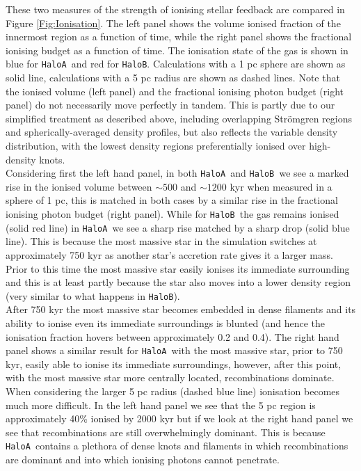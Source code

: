 \documentclass[graphics, twocolumn, usenatbib]{mn2e}
\newcommand{\ha} {\texttt{HaloA~}}
\newcommand{\hb} {\texttt{HaloB~}}
\newcommand{\hbc} {\texttt{HaloB}}
\begin{document}
These two measures of the strength of ionising stellar feedback are compared in
Figure \ref{Fig:Ionisation}. The left panel shows the volume ionised fraction of the innermost
region as a function of time, while the right panel shows
the fractional ionising budget as a function of time. The ionisation state of the gas is shown in
blue for \ha and red for \hbc. Calculations with a 1 pc sphere are shown as solid line, calculations
with a 5 pc radius are shown as dashed lines. Note that the ionised volume (left panel)
and the fractional ionising photon budget (right panel) do not necessarily
move perfectly in tandem. This is partly due to our simplified treatment as described above,
including overlapping Str{\" o}mgren regions and spherically-averaged density profiles, but also
reflects the variable density distribution, with the lowest density regions preferentially
ionised over high-density knots. \\
\indent Considering first the left hand panel, in both \ha and \hb we see a marked rise in the
ionised volume between $\sim 500$ and $\sim1200$ kyr when measured in a sphere of 1 pc, this is
matched in both cases by a similar rise in the fractional ionising photon budget (right panel).
While for \hb the gas remains ionised (solid red line) in \ha we see a sharp rise matched by a
sharp drop (solid blue line). This is because the most massive star in the simulation switches at
approximately 750 kyr as another star's accretion rate gives it a larger mass. Prior to this time
the most massive star easily ionises its immediate
surrounding and this is at least partly because the star also moves into a lower density region
(very similar to what happens in \hbc). \\
\indent After 750 kyr the most massive star becomes embedded in
dense filaments and its ability to ionise even its immediate surroundings is blunted (and hence the
ionisation fraction hovers between approximately 0.2 and 0.4). The
right hand panel shows a similar result for \ha with the most massive star, prior to 750 kyr, easily
able to ionise
its immediate surroundings, however, after this point, with the most massive star more centrally
located, recombinations dominate. When considering the larger 5 pc radius (dashed blue line)
ionisation becomes much more difficult. In the left hand panel we see that the 5 pc region
is approximately 40\% ionised by 2000 kyr but if we look at the right hand panel we see that recombinations are still overwhelmingly dominant. This is because \ha contains a plethora of dense knots and
filaments in which recombinations are dominant and into which ionising photons cannot penetrate. \\
\end{document}
